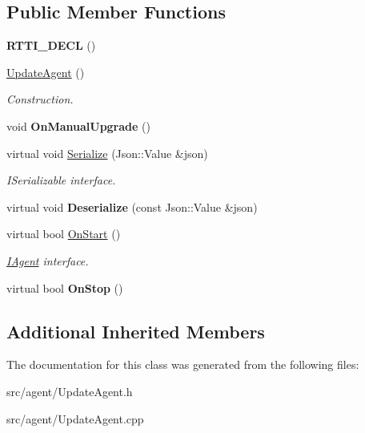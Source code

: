 \subsection*{Public Member Functions}
\begin{DoxyCompactItemize}
\item 
\mbox{\label{class_update_agent_a88946df009a5a3d2a0e8d9e8e02233bc}} 
{\bfseries R\+T\+T\+I\+\_\+\+D\+E\+CL} ()
\item 
\mbox{\label{class_update_agent_a6b69cb690e452df524af702788310bee}} 
\hyperlink{class_update_agent_a6b69cb690e452df524af702788310bee}{Update\+Agent} ()
\begin{DoxyCompactList}\small\item\em Construction. \end{DoxyCompactList}\item 
\mbox{\label{class_update_agent_ac37006d26249379cc15636c88cdda2de}} 
void {\bfseries On\+Manual\+Upgrade} ()
\item 
\mbox{\label{class_update_agent_a492434062fbf3867f8f12aa76d7ed221}} 
virtual void \hyperlink{class_update_agent_a492434062fbf3867f8f12aa76d7ed221}{Serialize} (Json\+::\+Value \&json)
\begin{DoxyCompactList}\small\item\em I\+Serializable interface. \end{DoxyCompactList}\item 
\mbox{\label{class_update_agent_aee8610d6755171be58be00cf2da63d04}} 
virtual void {\bfseries Deserialize} (const Json\+::\+Value \&json)
\item 
\mbox{\label{class_update_agent_ad7f3ae47f22506fcffa923180433a58c}} 
virtual bool \hyperlink{class_update_agent_ad7f3ae47f22506fcffa923180433a58c}{On\+Start} ()
\begin{DoxyCompactList}\small\item\em \hyperlink{class_i_agent}{I\+Agent} interface. \end{DoxyCompactList}\item 
\mbox{\label{class_update_agent_a23b5c10f2e34ab2b8cb7b08bd79f3883}} 
virtual bool {\bfseries On\+Stop} ()
\end{DoxyCompactItemize}
\subsection*{Additional Inherited Members}


The documentation for this class was generated from the following files\+:\begin{DoxyCompactItemize}
\item 
src/agent/Update\+Agent.\+h\item 
src/agent/Update\+Agent.\+cpp\end{DoxyCompactItemize}
